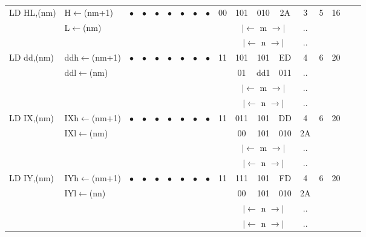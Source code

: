 \documentclass[oneside,a4paper]{book}
\begin{document}
{\begin{tabular}{llcccccccccccccccl}
		LD HL,(nm)\instrt & 
			H$\leftarrow$(nm+1) &
			$\bullet$ & 
				$\bullet$ & 
				$\bullet$ & 
				$\bullet$ & 
				$\bullet$ & 
				$\bullet$ & 
				$\bullet$ & 
			00 & 101 & 010 & 
			2A & 3 & 
			5 & 16 & \\ 
		& L$\leftarrow$(nm) & \multicolumn{8}{c}{} & \multicolumn{3}{c}{$|\longleftarrow$ m $\longrightarrow|$} & .. & & & \\
		\multicolumn{10}{c}{} & \multicolumn{3}{c}{$|\longleftarrow$ n $\longrightarrow|$} & .. & & & \instrb \\

		LD dd,(nm)\instrt & 
			ddh$\leftarrow$(nm+1) &
			$\bullet$ & 
				$\bullet$ & 
				$\bullet$ & 
				$\bullet$ & 
				$\bullet$ & 
				$\bullet$ & 
				$\bullet$ & 
			11 & 101 & 101 & 
			ED & 4 & 
			6 & 20 & \\ 
		& ddl$\leftarrow$(nm) & \multicolumn{8}{c}{} & 01 & dd1 & 011 & .. & & & \\
		\multicolumn{10}{c}{} & \multicolumn{3}{c}{$|\longleftarrow$ m $\longrightarrow|$} & .. & & & \\
		\multicolumn{10}{c}{} & \multicolumn{3}{c}{$|\longleftarrow$ n $\longrightarrow|$} & .. & & & \instrb \\

		LD IX,(nm)\instrt &
			IXh$\leftarrow$(nm+1) &
			$\bullet$ & 
				$\bullet$ & 
				$\bullet$ & 
				$\bullet$ & 
				$\bullet$ & 
				$\bullet$ & 
				$\bullet$ & 
			11 & 011 & 101 & 
			DD & 4 & 
			6 & 20 & \\ 
		& IXl$\leftarrow$(nm) & \multicolumn{8}{c}{} & 00 & 101 & 010 & 2A & & & \\
		\multicolumn{10}{c}{} & \multicolumn{3}{c}{$|\longleftarrow$ m $\longrightarrow|$} & .. & & & \\
		\multicolumn{10}{c}{} & \multicolumn{3}{c}{$|\longleftarrow$ n $\longrightarrow|$} & .. & & & \instrb \\

		LD IY,(nm)\instrt &
			IYh$\leftarrow$(nm+1) &
			$\bullet$ & 
				$\bullet$ & 
				$\bullet$ & 
				$\bullet$ & 
				$\bullet$ & 
				$\bullet$ & 
				$\bullet$ & 
			11 & 111 & 101 & 
			FD & 4 & 
			6 & 20 & \\ 
		& IYl$\leftarrow$(nn) & \multicolumn{8}{c}{} & 00 & 101 & 010 & 2A & & & \\
		\multicolumn{10}{c}{} & \multicolumn{3}{c}{$|\longleftarrow$ n $\longrightarrow|$} & .. & & & \\
		\multicolumn{10}{c}{} & \multicolumn{3}{c}{$|\longleftarrow$ n $\longrightarrow|$} & .. & & & \instrb \\


\end{tabular}}
\end{document}
